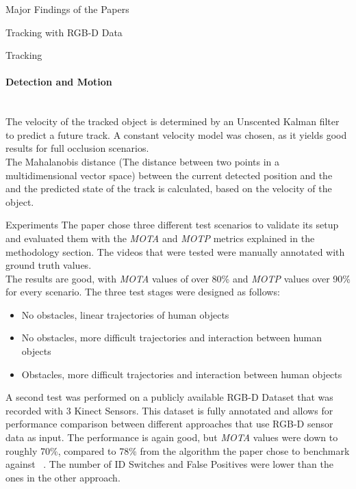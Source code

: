\documentclass[a4paper,oneside,10pt,DIV12,headsepline,footexclude,headexclude]{scrartcl}
\begin{document}
\begin{section}{Major Findings of the Papers}
\begin{subsection}{Tracking with RGB-D Data}
\begin{subsubsection}{Tracking}
\paragraph{Detection and Motion}\mbox{}\\
The velocity of the tracked object is determined by an Unscented Kalman filter to predict 
a future track. A constant velocity model was chosen, as it yields good results
for full occlusion scenarios.\\
The Mahalanobis distance (The distance between two points in a multidimensional vector space)
between the current detected position and the and the predicted state of the track
is calculated, based on the velocity of the object. 
\end{subsubsection}
\begin{subsection}{Experiments}
The paper chose three different test scenarios to validate its setup and
evaluated them with the \textit{MOTA} and \textit{MOTP} metrics explained in the
methodology section. The videos that were tested were manually annotated with 
ground truth values.\\
The results are good, with \textit{MOTA} values of over 80\% and \textit{MOTP} values over
90\% for every scenario.
The three test stages were designed as follows:
\begin{itemize}
\item No obstacles, linear trajectories of human objects
\item No obstacles, more difficult trajectories and interaction between human objects
\item Obstacles, more difficult trajectories and interaction between human objects 
\end{itemize}
A second test was performed on a publicly available RGB-D Dataset that was 
recorded with 3 Kinect Sensors. This dataset is fully annotated and allows for 
performance comparison between different approaches that use RGB-D sensor data
as input. The performance is again good, but \textit{MOTA} values were down to 
roughly 70\%, compared to 78\% from the algorithm the paper chose to benchmark against ~\cite{luber2011people}.
The number of ID Switches and False Positives were lower than the ones in the 
other approach. 
\end{subsection}
\end{subsection}

\end{section}
\end{document}

